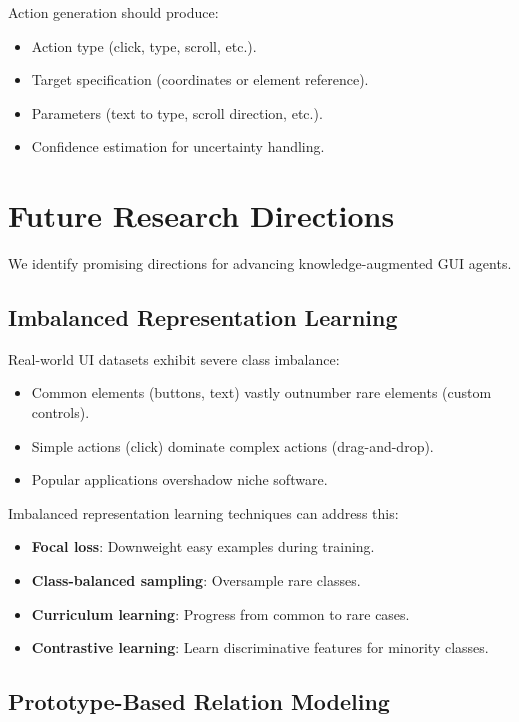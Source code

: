 \documentclass[11pt]{article}
\begin{document}
Action generation should produce:

\begin{itemize}
    \item Action type (click, type, scroll, etc.).
    \item Target specification (coordinates or element reference).
    \item Parameters (text to type, scroll direction, etc.).
    \item Confidence estimation for uncertainty handling.
\end{itemize}

\section{Future Research Directions}
\label{sec:future}

We identify promising directions for advancing knowledge-augmented GUI agents.

\subsection{Imbalanced Representation Learning}

Real-world UI datasets exhibit severe class imbalance:

\begin{itemize}
    \item Common elements (buttons, text) vastly outnumber rare elements (custom controls).
    \item Simple actions (click) dominate complex actions (drag-and-drop).
    \item Popular applications overshadow niche software.
\end{itemize}

Imbalanced representation learning techniques can address this:

\begin{itemize}
    \item \textbf{Focal loss}: Downweight easy examples during training.
    \item \textbf{Class-balanced sampling}: Oversample rare classes.
    \item \textbf{Curriculum learning}: Progress from common to rare cases.
    \item \textbf{Contrastive learning}: Learn discriminative features for minority classes.
\end{itemize}

\subsection{Prototype-Based Relation Modeling}
\end{document}
